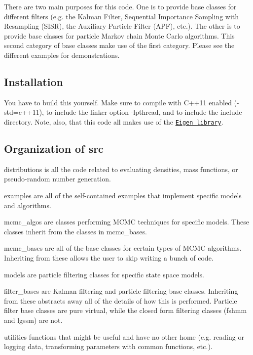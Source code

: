 There are two main purposes for this code. One is to provide base classes for different filters (e.\+g. the Kalman Filter, Sequential Importance Sampling with Resampling (S\+I\+SR), the Auxiliary Particle Filter (A\+PF), etc.). The other is to provide base classes for particle Markov chain Monte Carlo algorithms. This second category of base classes make use of the first category. Please see the different examples for demonstrations.

\subsection*{Installation}

You have to build this yourself. Make sure to compile with C++11 enabled ({\ttfamily -\/std=c++11}), to include the linker option {\ttfamily -\/lpthread}, and to include the {\ttfamily include} directory. Note, also, that this code all makes use of the \href{http://eigen.tuxfamily.org/}{\tt Eigen library}.

\subsection*{Organization of {\ttfamily src}}


\begin{DoxyEnumerate}
\item {\ttfamily distributions} is all the code related to evaluating densities, mass functions, or pseudo-\/random number generation.
\item {\ttfamily examples} are all of the self-\/contained examples that implement specific models and algorithms.
\item {\ttfamily mcmc\+\_\+algos} are classes performing M\+C\+MC techniques for specific models. These classes inherit from the classes in {\ttfamily mcmc\+\_\+bases}.
\item {\ttfamily mcmc\+\_\+bases} are all of the base classes for certain types of M\+C\+MC algorithms. Inheriting from these allows the user to skip writing a bunch of code.
\item {\ttfamily models} are particle filtering classes for specific state space models.
\item {\ttfamily filter\+\_\+bases} are Kalman filtering and particle filtering base classes. Inheriting from these abstracts away all of the details of how this is performed. Particle filter base classes are pure virtual, while the closed form filtering classes (fshmm and lgssm) are not.
\item {\ttfamily utilities} functions that might be useful and have no other home (e.\+g. reading or logging data, transforming parameters with common functions, etc.).
\end{DoxyEnumerate}

